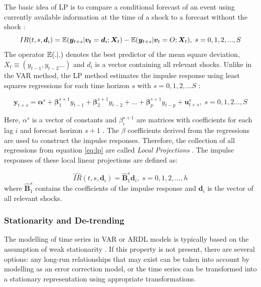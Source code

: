 The basic idea of LP is to compare a conditional forecast of an event using currently available information at the time of a shock to a forecast without the shock \citep[163]{Jorda.2005}:
\begin{equation}
	IR(t,s,\bm{d}_i) = \operatorname*{\mathbb{E}}(\bm{y}_{t+s}|\bm{v_t} = \bm{d}_i;\bm{X}_t)-\operatorname*{\mathbb{E}}(\bm{y}_{t+s}|\bm{v}_t=O;\bm{X}_t), \; s = 0,1,2,...,S
\end{equation}
\noindent The operator $\operatorname*{\mathbb{E}}(.|.)$ denotes the best predictor of the mean square deviation, $X_t \equiv (y_{t-1},y_{t-2}...)$ and $d_i$ is a vector containing all relevant shocks. Unlike in the VAR method, the LP method estimates the impulse response using least squares regressions for each time horizon $s$ with $s=0,1,2,...S$ \citep[423]{Adaemmer.2019}:

\begin{equation}\label{eq:lp}
	\bm{y}_{t+s}=\bm{\alpha}^s+\bm{\beta}_1^{s+1}y_{t-1}+\bm{\beta}_2^{s+1}y_{t-2}+...+\bm{\beta}_p^{s+1}y_{t-p}+\bm{u}_{t+s}^s, \; s=0,1,2...,S
\end{equation}

\noindent Here, $\alpha^s$ is a vector of constants and $\beta_i^{s+1}$ are matrices with coefficients for each lag $i$ and forecast horizon $s+1$ \citep[163]{Jorda.2005}. The $\beta$ coefficients derived from the regressions are used to construct the impulse responses. Therefore, the collection of all regressions from equation \ref{eq:lp} are called \textit{Local Projections} \citep[423]{Adaemmer.2019}. The impulse responses of these local linear projections are defined as:

\begin{equation}
	\widehat{IR}(t,s,\bm{d}_i) = \hat{\bm{B}}_{1}^s\bm{d}_i, \; s=0,1,2,...,h
\end{equation}
\noindent where $\hat{\bm{B}}_1^s$ contains the coefficients of the impulse response and $\bm{d}_i$ is the vector of all relevant shocks. 

\subsubsection{Stationarity and De-trending}

The modelling of time series in VAR or ARDL models is typically based on the assumption of weak stationarity \citep[13]{Kirchgaesser.2007}. If this property is not present, there are several options: any long-run relationships that may exist can be taken into account by modelling as an error correction model, or the time series can be transformed into a stationary representation using appropriate transformations. 

